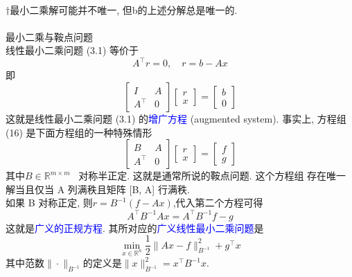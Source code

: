 \documentclass[12pt,a4paper]{article}
\begin{document}
\\
$\dagger$最小二乘解可能并不唯一, 但b的上述分解总是唯一的.\\
\\
最小二乘与鞍点问题\\
线性最小二乘问题 (3.1) 等价于
$$
A^{\top} r=0, \quad r=b-A x
$$
即
\begin{equation}
\left[\begin{array}{cc}{I} & {A} \\ {A^{\top}} & {0}\end{array}\right]\left[\begin{array}{l}{r} \\ {x}\end{array}\right]=\left[\begin{array}{l}{b} \\ {0}\end{array}\right]
\end{equation}
这就是线性最小二乘问题 (3.1) 的\textcolor{blue}{增广方程} (augmented system). 事实上,
方程组 (16) 是下面方程组的一种特殊情形
$$
\left[\begin{array}{cc}{B} & {A} \\ {A^{\top}} & {0}\end{array}\right]\left[\begin{array}{l}{r} \\ {x}\end{array}\right]=\left[\begin{array}{l}{f} \\ {g}\end{array}\right]
$$
其中$B \in \mathbb{R}^{m \times m}$ ~对称半正定. 这就是通常所说的鞍点问题. 这个方程组 存在唯一解当且仅当 A 列满秩且矩阵 [B, A] 行满秩.\\
如果 B 对称正定, 则$r=B^{-1}(f-A x)$,代入第二个方程可得
$$
A^{\top} B^{-1} A x=A^{\top} B^{-1} f-g
$$
这就是\textcolor{blue}{广义的正规方程}. 其所对应的\textcolor{blue}{广义线性最小二乘问题}是
$$
\min _{x \in \mathbb{R}^{n}} \frac{1}{2}\|A x-f\|_{B^{-1}}^{2}+g^{\top} x
$$
其中范数$\|\cdot\|_{B^{-1}}$的定义是$\|x\|_{B^{-1}}^{2}=x^{\top} B^{-1} x$.
\end{document}
